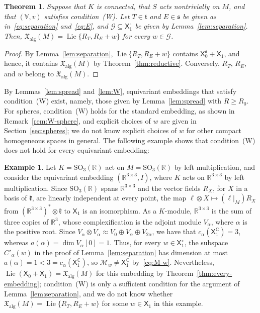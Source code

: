 \documentclass{article}
\newcommand{\R}{\mathbb{R}}
\newcommand{\C}{\mathbb{C}}
\newcommand{\frakk}{\mathfrak{k}}
\newcommand{\fraks}{\mathfrak{s}}
\newcommand{\frakt}{\mathfrak{t}}
\newcommand{\xalg}{\mathfrak X_{\mathrm{alg}}}
\newcommand{\sX}{\mathsf{X}}
\newtheorem{theorem}{Theorem}
\theoremstyle{definition}
\newtheorem{example}{Example}
\theoremstyle{plain}
\begin{document}
\begin{theorem}\label{thm:two-generators}
Suppose that $K$ is connected, that $S$ acts nontrivially on $M$, and that $(\mathbb V,v)$ satisfies condition~(W).
Let $T\in\frakt$ and $E\in\fraks$ be given as in~\eqref{eq:separation} and~\eqref{eq:E}, and $\mathcal G\subseteq\sX_1^\circ$ be given by Lemma~\ref{lem:separation}.
Then, $\xalg(M)=\operatorname{Lie}\{R_T,R_E+w\}$ for every $w\in\mathcal G$.
\end{theorem}

\begin{proof}
By Lemma~\ref{lem:separation}, $\operatorname{Lie}\{R_T,R_E+w\}$ contains $\sX_0^{\fraks}+\sX_1$, and hence, it contains $\xalg(M)$ by Theorem~\ref{thm:reductive}. Conversely, $R_T$, $R_E$, and $w$ belong to $\xalg(M)$.
\end{proof}

By Lemmas~\ref{lem:spread} and~\ref{lem:W}, equivariant embeddings that satisfy condition~(W) exist, namely, those given by Lemma~\ref{lem:spread} with $R\geq R_0$.
For spheres, condition~(W) holds for the standard embedding, as shown in Remark~\ref{rem:W-sphere}, and explicit choices of $w$ are given in Section~\ref{sec:spheres}; we do not know explicit choices of $w$ for other compact homogeneous spaces in general.
The following example shows that condition~(W) does not hold for every equivariant embedding:

\begin{example}\label{rem:W-fails}
Let $K=\mathrm{SO}_3(\R)$ act on $M=\mathrm{SO}_3(\R)$ by left multiplication, and consider the equivariant embedding $(\R^{3\times3},I)$,
  where $K$ acts on $\R^{3\times3}$ by left multiplication.
Since $\mathrm{SO}_3(\R)$ spans $\R^{3\times3}$ and the vector fields $R_X$, for $X$ in a basis of $\frakk$, are linearly independent at every point, the map $\ell\otimes X\mapsto(\ell|_M)R_X$ from $(\R^{3\times3})^*\otimes\frakk$ to $\sX_1$ is an isomorphism.
As a $K$-module, $\R^{3\times3}$ is the sum of three copies of $\R^3$, whose complexification is the adjoint module $V_\alpha$, where $\alpha$ is the positive root.
Since $V_\alpha\otimes V_\alpha\approx V_0\oplus V_\alpha\oplus V_{2\alpha}$, we have that $c_\alpha(\sX_1^\C)=3$, whereas $a(\alpha)=\dim V_\alpha[0]=1$.
 Thus, for every $w\in\sX_1^\circ$, the subspace $C'_\alpha(w)$ in the proof of Lemma~\ref{lem:separation} has dimension at most $a(\alpha)=1<3=c_\alpha(\sX_1^\C)$, so $\mathcal M_w\neq\sX_1^\C$ by~\eqref{eq:M-w}.
Nevertheless, $\operatorname{Lie}(\sX_0+\sX_1)=\xalg(M)$ for this embedding by Theorem~\ref{thm:every-embedding}; condition~(W) is only a sufficient condition for the argument of Lemma~\ref{lem:separation},
  and we do not know whether $\xalg(M)=\operatorname{Lie}\{R_T,R_E+w\}$ for some $w\in\sX_1$ in this example.
\end{example}
\end{document}
